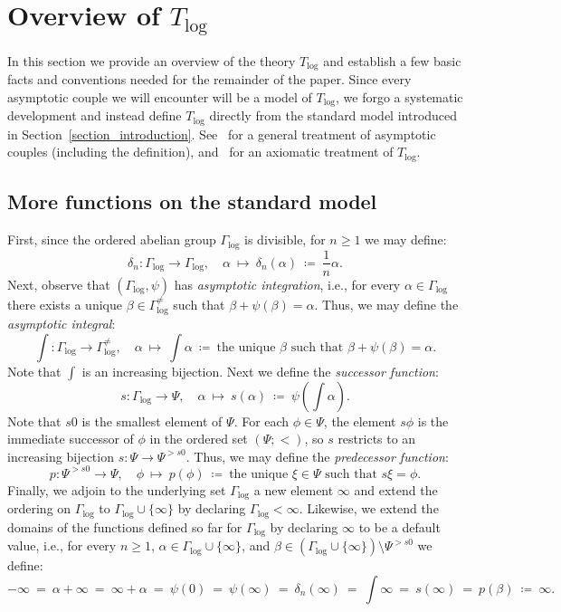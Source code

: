 \documentclass[11pt]{amsart}
\theoremstyle{plain}
\theoremstyle{definition}
\numberwithin{equation}{section}
\newcommand\0{\varnothing}
\begin{document}
\section{Overview of \texorpdfstring{$T_{\log}$}{Tₗₒ₉}}\label{section_overview_Tlog}

\noindent
In this section we provide an overview of the theory $T_{\log}$ and establish a few basic facts and conventions needed for the remainder of the paper. Since every asymptotic couple we will encounter will be a model of $T_{\log}$, we forgo a systematic development and instead define $T_{\log}$ directly from the standard model introduced in Section~\ref{section_introduction}. See~\cite[Sections~6.5, 9.2]{ADAMTT} for a general treatment of asymptotic couples (including the definition), and~\cite{GehretACTlog} for an axiomatic treatment of $T_{\log}$.

\subsection{More functions on the standard model} First, since the ordered abelian group $\Gamma_{\log}$ is divisible, for $n\geq 1$ we may define:
\[
\delta_n \colon \Gamma_{\log}\to\Gamma_{\log},\quad \alpha \ \mapsto \ \delta_n(\alpha) \ \coloneqq \ \textstyle\frac{1}{n}\alpha.
\]
Next, observe that $(\Gamma_{\log},\psi)$ has \emph{asymptotic integration}, i.e., for every $\alpha\in\Gamma_{\log}$ there exists a unique $\beta\in\Gamma_{\log}^{\neq}$ such that $\beta+\psi(\beta)=\alpha$. 
Thus, we may define the \emph{asymptotic integral}:
\[
\textstyle \int \colon \Gamma_{\log}\to \Gamma_{\log}^{\neq},\quad \alpha \ \mapsto \ \int\alpha \ \coloneqq \ \text{the unique $\beta$ such that $\beta+\psi(\beta)=\alpha$}.
\]
Note that $\int$ is an increasing bijection.
Next we define the \emph{successor function}:
\[
s \colon \Gamma_{\log}\to\Psi,\quad \alpha \ \mapsto \ s(\alpha) \ \coloneqq \ \textstyle \psi(\int\alpha).
\]
Note that $s0$ is the smallest element of $\Psi$. For each $\phi\in\Psi$, the element $s\phi$ is the immediate successor of $\phi$ in the ordered set $(\Psi;<)$, so $s$ restricts to an increasing bijection $s\colon\Psi\to\Psi^{>s0}$. Thus, we may define the \emph{predecessor function}:
\[
p \colon \Psi^{>s0}\to\Psi,\quad \phi \ \mapsto \ p(\phi) \ \coloneqq \ \text{the unique $\xi\in\Psi$ such that $s\xi=\phi$}.
\]
Finally, we adjoin to the underlying set $\Gamma_{\log}$ a new element $\infty$ and extend the ordering on $\Gamma_{\log}$ to $\Gamma_{\log}\cup\{\infty\}$ by declaring $\Gamma_{\log}<\infty$. Likewise, we extend the domains of the functions  defined so far for $\Gamma_{\log}$ by declaring $\infty$ to be a default value, i.e., for every $n\geq 1$, $\alpha\in\Gamma_{\log}\cup\{\infty\}$, and $\beta\in(\Gamma_{\log}\cup\{\infty\})\setminus\Psi^{>s0}$
we define:
\[
\textstyle
-\infty \ = \ \alpha+\infty \ = \ \infty+\alpha \ = \ \psi(0) \ = \ \psi(\infty) \ = \ \delta_n(\infty) \ = \ \int\infty \ = \ s(\infty) \ = \ p(\beta) \ \coloneqq \ \infty.
\]
\end{document}
